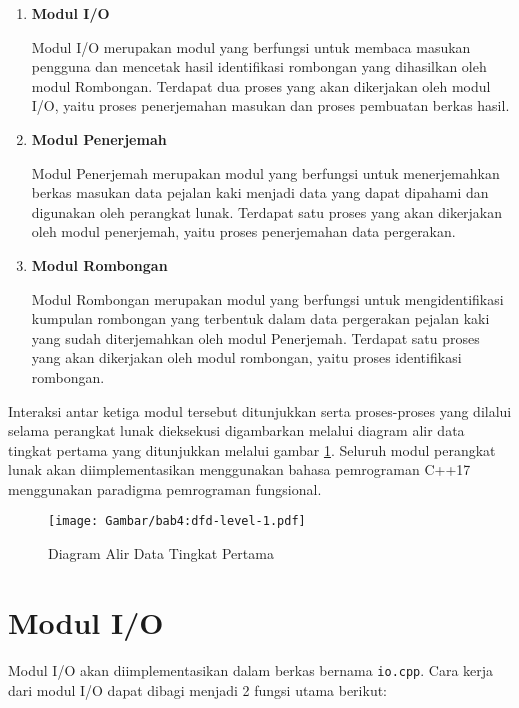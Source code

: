 \begin{enumerate}
    \item \textbf{Modul I/O}
    
    Modul I/O merupakan modul yang berfungsi untuk membaca masukan pengguna dan mencetak hasil identifikasi rombongan yang dihasilkan oleh modul Rombongan. Terdapat dua proses yang akan dikerjakan oleh modul I/O, yaitu proses penerjemahan masukan dan proses pembuatan berkas hasil.
    
    \item \textbf{Modul Penerjemah}
    
    Modul Penerjemah merupakan modul yang berfungsi untuk menerjemahkan berkas masukan data pejalan kaki menjadi data yang dapat dipahami dan digunakan oleh perangkat lunak. Terdapat satu proses yang akan dikerjakan oleh modul penerjemah, yaitu proses penerjemahan data pergerakan.
    
    \item \textbf{Modul Rombongan}
    
    Modul Rombongan merupakan modul yang berfungsi untuk mengidentifikasi kumpulan rombongan yang terbentuk dalam data pergerakan pejalan kaki yang sudah diterjemahkan oleh modul Penerjemah. Terdapat satu proses yang akan dikerjakan oleh modul rombongan, yaitu proses identifikasi rombongan.
\end{enumerate}

Interaksi antar ketiga modul tersebut ditunjukkan serta proses-proses yang dilalui selama perangkat lunak dieksekusi digambarkan melalui diagram alir data tingkat pertama yang ditunjukkan melalui gambar \ref{bab4:dfd-level-1}. Seluruh modul perangkat lunak akan diimplementasikan menggunakan bahasa pemrograman C++17 menggunakan paradigma pemrograman fungsional.

\begin{figure}[t!]
    \centering
    \texttt{[image: Gambar/bab4:dfd-level-1.pdf]}
    \caption{Diagram Alir Data Tingkat Pertama}
    \label{bab4:dfd-level-1}
\end{figure}

\section{Modul I/O}
\label{io}

Modul I/O akan diimplementasikan dalam berkas bernama \texttt{io.cpp}. Cara kerja dari modul I/O dapat dibagi menjadi 2 fungsi utama berikut:

